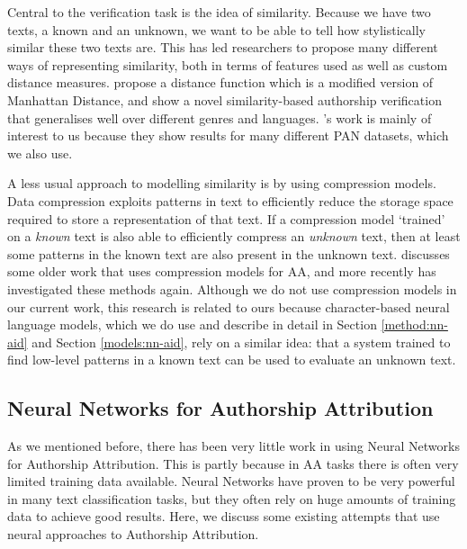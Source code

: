 Central to the verification task is the idea of similarity. Because we have two texts, a known and an unknown, we want to be able to tell how stylistically similar these two texts are. This has led researchers to propose many different ways of representing similarity, both in terms of features used as well as custom distance measures. \citet{halvani2016authorship} propose a distance function which is a modified version of Manhattan Distance, and show a novel similarity-based authorship verification that generalises well over different genres and languages. \citeauthor{halvani2016authorship}'s work is mainly of interest to us because they show results for many different PAN datasets, which we also use. 

A less usual approach to modelling similarity is by using compression models. Data compression exploits patterns in text to efficiently reduce the storage space required to store a representation of that text. If a compression model `trained' on a \textit{known} text is also able to efficiently compress an \textit{unknown} text, then at least some patterns in the known text are also present in the unknown text. \citet{stamatatos2009survey} discusses some older work that uses compression models for AA, and more recently \citet{halvani2017authorship} has investigated these methods again. Although we do not use compression models in our current work, this research is related to ours because character-based neural language models, which we do use and describe in detail in Section \ref{method:nn-aid} and Section \ref{models:nn-aid}, rely on a similar idea: that a system trained to find low-level patterns in a known text can be used to evaluate an unknown text.

\subsection{Neural Networks for Authorship Attribution}
\label{background:nn-aid}
As we mentioned before, there has been very little work in using Neural Networks for Authorship Attribution. This is partly because in AA tasks there is often very limited training data available. Neural Networks have proven to be very powerful in many text classification tasks, but they often rely on huge amounts of training data to achieve good results. Here, we discuss some existing attempts that use neural approaches to Authorship Attribution.

